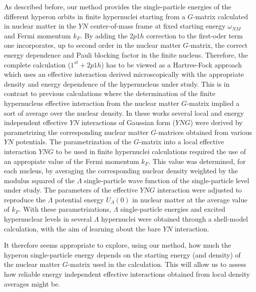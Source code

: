 As described before, our method provides the single-particle energies
of the different hyperon orbits in finite hypernuclei starting from a
$G$-matrix calculated in nuclear matter in the $YN$
center-of-mass frame at
fixed starting energy $\omega_{NM}$ and Fermi momentum $k_F$.
By adding the $2p1h$ correction to the first-oder term one
incorporates,
up to second order in the nuclear matter $G$-matrix, the correct
energy dependence and Pauli blocking factor in the finite nucleus.
Therefore, the complete calculation ($1^{st}+2p1h$) has to be
viewed as a Hartree-Fock approach which uses an
effective interaction derived microscopically with the appropriate density and energy
dependence of the hypernucleus under study.
This is in contrast to previous calculations 
\cite{yama85,yama90,yama92,yama94} where the determination of 
the finite hypernucleus effective interaction from
the nuclear matter $G$-matrix implied a sort of
average over the nuclear density. In these works several local and
energy independent effective $YN$ interactions of Gaussian form ($YNG$)
were derived by parametrizing the corresponding nuclear matter
$G$-matrices obtained from various $YN$ potentials.
The parametrization of the $G$-matrix into a local effective
interaction $YNG$ to be used in finite hypernuclei calculations
required the use of an appropiate value of the Fermi momentum $k_F$.
This value was determined, for each
nucleus, by averaging the corresponding nuclear density weighted by
the modulus squared of the $\Lambda$
single-particle wave function of the single-particle
level under study. The parameters of the effective $YNG$ interaction 
were adjusted to
reproduce the
$\Lambda$ potential energy $U_\Lambda(0)$ in nuclear matter at the
average value of $k_F$.
With these parametrizations, $\Lambda$
single-particle energies and excited hypernuclear levels in several
$\Lambda$
hypernuclei were obtained through a shell-model calculation, with the
aim of learning about the bare $YN$ interaction.

It therefore seems appropriate to explore, using our method, how much
the hyperon single-particle energy depends on the starting energy (and
density) 
of the nuclear matter
$G$-matrix used in the calculation. This will allow us to assess
how reliable energy independent effective interactions obtained
from local density averages might be.



